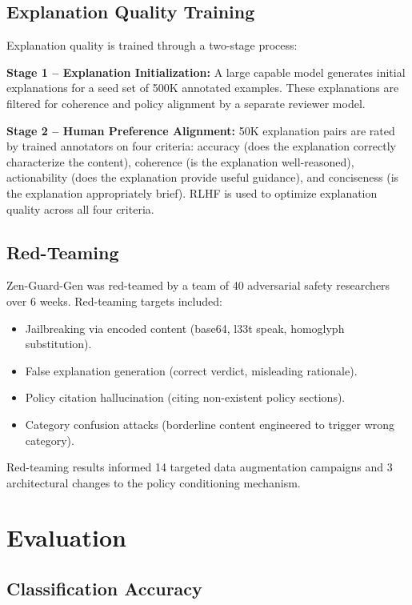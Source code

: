 \documentclass[11pt,a4paper]{article}
\begin{document}
\subsection{Explanation Quality Training}

Explanation quality is trained through a two-stage process:

\textbf{Stage 1 -- Explanation Initialization:} A large capable model generates initial explanations for a seed set of 500K annotated examples. These explanations are filtered for coherence and policy alignment by a separate reviewer model.

\textbf{Stage 2 -- Human Preference Alignment:} 50K explanation pairs are rated by trained annotators on four criteria: accuracy (does the explanation correctly characterize the content), coherence (is the explanation well-reasoned), actionability (does the explanation provide useful guidance), and conciseness (is the explanation appropriately brief). RLHF is used to optimize explanation quality across all four criteria.

\subsection{Red-Teaming}

Zen-Guard-Gen was red-teamed by a team of 40 adversarial safety researchers over 6 weeks. Red-teaming targets included:

\begin{itemize}
  \item Jailbreaking via encoded content (base64, l33t speak, homoglyph substitution).
  \item False explanation generation (correct verdict, misleading rationale).
  \item Policy citation hallucination (citing non-existent policy sections).
  \item Category confusion attacks (borderline content engineered to trigger wrong category).
\end{itemize}

Red-teaming results informed 14 targeted data augmentation campaigns and 3 architectural changes to the policy conditioning mechanism.

\section{Evaluation}

\subsection{Classification Accuracy}
\end{document}
